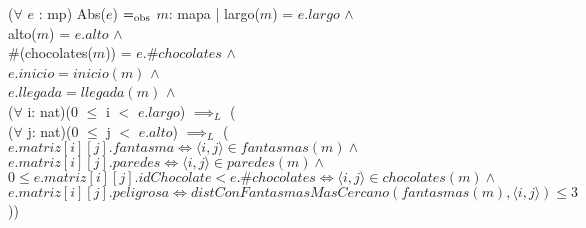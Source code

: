 \documentclass[10pt, a4paper]{article}
\begin{document}
        ($\forall$ $e$ : mp) Abs($e$) $=_{\mathrm{obs}}$ $m$: mapa | largo($m$) = $e.largo$ $\wedge$ \\
            \text{}\qquad alto($m$) = $e.alto$ $\wedge$ \\
            \text{}\qquad \#(chocolates($m$)) = $e.\#chocolates$ $\wedge$ \\
            \text{}\qquad $e.inicio = inicio(m)$ $\wedge$ \\
            \text{}\qquad $e.llegada = llegada(m)$ $\wedge$ \\
            \text{}\qquad ($\forall$ i: nat)(0 $\leq$ i $<$ $e.largo$) $\implies_L$ ( \\
                \text{}\qquad\quad ($\forall$ j: nat)(0 $\leq$ j $<$ $e.alto$) $\implies_L$ ( \\
                \text{}\qquad\quad $e.matriz[i][j].fantasma \iff \langle i,j \rangle \in fantasmas(m) \wedge $ \\
                \text{}\qquad\quad $e.matriz[i][j].paredes \iff \langle i,j \rangle \in paredes(m) \wedge $ \\
                \text{}\qquad\quad $0 \leq e.matriz[i][j].idChocolate < e.\#chocolates \iff \langle i,j \rangle \in chocolates(m) \wedge $ \\
                \text{}\qquad\quad $e.matriz[i][j].peligrosa \iff distConFantasmasMasCercano(fantasmas(m), \langle i,j \rangle) \leq 3$))
\end{document}
